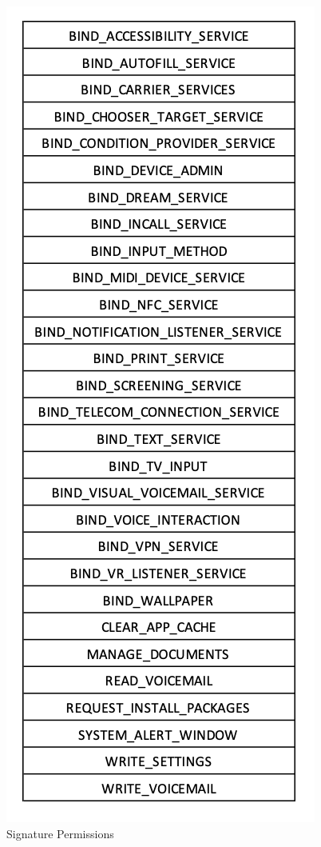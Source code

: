 \documentclass[12pt,twoside]{report}
\begin{document}
\begin{figure}
    \centering
    \includegraphics{figures/Signature_Permissions.png}
    \caption{Signature Permissions}
    \label{fig:my_label}
\end{figure}
\end{document}
